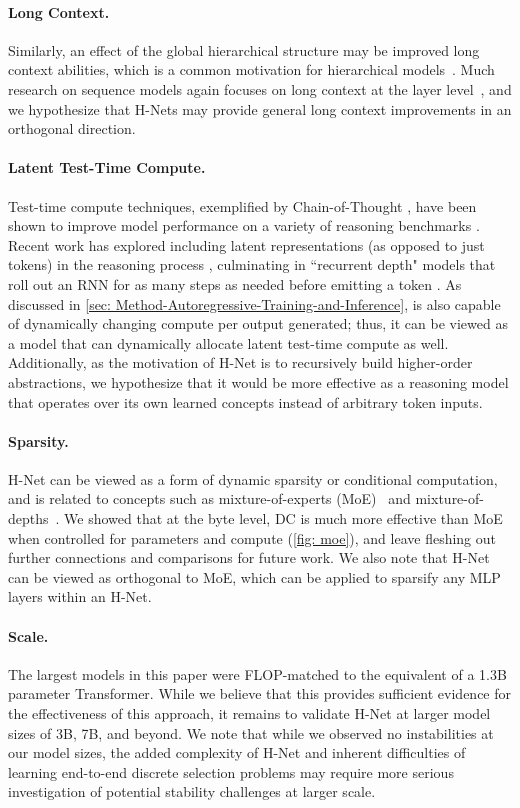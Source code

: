 \paragraph{Long Context.}
Similarly, an effect of the global hierarchical structure may be improved long context abilities, which is a common motivation for hierarchical models~\citep{CW-RNN, DilatedRNN}.
Much research on sequence models again focuses on long context at the layer level~\citep{hyena, Mamba, Transformer}, and we hypothesize that H-Nets may provide general long context improvements in an orthogonal direction.

\paragraph{Latent Test-Time Compute.}
Test-time compute techniques, exemplified by Chain-of-Thought \citep{CoT}, have been shown to improve model performance on a variety of reasoning benchmarks \citep{S1,o1preview}. 
Recent work has explored including latent representations (as opposed to just tokens) in the reasoning process \citep{coconut}, culminating in ``recurrent depth" models that 
roll out an RNN for as many steps as needed before emitting a token \citep{ReccurentDepth}.
As discussed in \cref{sec: Method-Autoregressive-Training-and-Inference}, \model{} is also capable of dynamically changing compute per output generated;
thus, it can be viewed as a model that can dynamically allocate latent test-time compute as well.
Additionally, as the motivation of H-Net is to recursively build higher-order abstractions, we hypothesize that it would be more effective as a reasoning model that operates over its own learned concepts instead of arbitrary token inputs.

\paragraph{Sparsity.}
H-Net can be viewed as a form of dynamic sparsity or conditional computation, and is related to concepts such as mixture-of-experts (MoE)~\citep{MoE, Original-MoE} and mixture-of-depths~\citep{Mixture-of-Depths}.
We showed that at the byte level, DC is much more effective than MoE when controlled for parameters and compute (\cref{fig: moe}), and leave fleshing out further connections and comparisons for future work.
We also note that H-Net can be viewed as orthogonal to MoE, which can be applied to sparsify any MLP layers within an H-Net. 


\paragraph{Scale.}
The largest models in this paper were FLOP-matched to the equivalent of a 1.3B parameter Transformer.
While we believe that this provides sufficient evidence for the effectiveness of this approach, it remains to validate H-Net at larger model sizes of 3B, 7B, and beyond. 
We note that while we observed no instabilities at our model sizes, the added complexity of H-Net and inherent difficulties of learning end-to-end discrete selection problems may require more serious investigation of potential stability challenges at larger scale.

